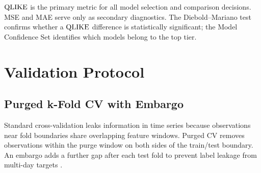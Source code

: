 \begin{keyidea}
$\operatorname{QLIKE}$ is the primary metric for all model selection and comparison decisions.
MSE and MAE serve only as secondary diagnostics.
The Diebold--Mariano test \citep{DieboldMariano1995} confirms whether a $\operatorname{QLIKE}$ difference is statistically significant; the Model Confidence Set \citep{HansenLundeNason2011} identifies which models belong to the top tier.
\end{keyidea}


\section{Validation Protocol}
\label{sec:validation}


\subsection{Purged k-Fold CV with Embargo}
\label{sec:purged-cv}

Standard cross-validation leaks information in time series because observations near fold boundaries share overlapping feature windows.
Purged CV removes observations within the purge window on both sides of the train/test boundary.
An embargo adds a further gap after each test fold to prevent label leakage from multi-day targets \citep{LopezdePrado2018}.

\begin{center}
\end{center}

